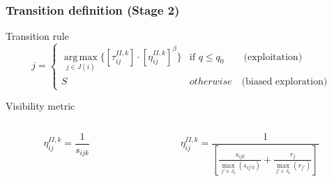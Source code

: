 \begin{frame} \frametitle{Transition definition (Stage 2)} 

\begin{block} {Transition rule}
\begin{equation} \label{eq:acsTauStage2}
j = 
\begin{cases} 
\displaystyle\operatorname*{arg\,max}_{j\in J(i)} \{ {[\tau_{ij}^{II,k}]\cdot[\eta_{ij}^{II,k}]^{\beta}} \} & \text{if } q\leq q_0 \quad\quad \text{(exploitation)} \\
S & otherwise \quad \text{(biased exploration)}
\end{cases}
\end{equation}
\end{block}

\begin{block}{Visibility metric}
	\begin{columns}[c]
		\begin{column}[c]{6cm}
		\begin{equation} \label{eq:acsEta1Stage2}
		\eta_{ij}^{II,k} = \frac{1}{s_{ijk}}
		\end{equation}
		\end{column}
		\pause
		\begin{column}[c]{6cm}
		\begin{equation} \label{eq:acsEta2Stage2}
		\eta_{ij}^{II,k} = \frac{1}{
			\left[ \frac{s_{ijk}}{\operatorname*{max}_{j'\in J_{k}}(s_{ij'k})} +
			\frac{r_{j}}{\operatorname*{max}_{j'\in J_{k}}(r_{j'})}\right]}
		\end{equation}
		\end{column}
	\end{columns}
\end{block}

\end{frame}


